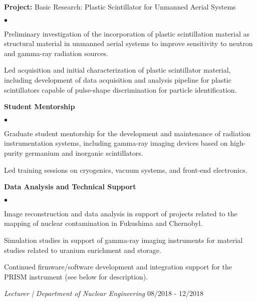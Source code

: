 \documentclass[margin,line]{res}
\newenvironment{list1}{
  \begin{list}{\ding{113}}{%
      \setlength{\itemsep}{0in}
      \setlength{\parsep}{0in} \setlength{\parskip}{0in}
      \setlength{\topsep}{0in} \setlength{\partopsep}{0in} 
      \setlength{\leftmargin}{0.17in}}}{\end{list}}
\newenvironment{list2}{
  \begin{list}{$\bullet$}{%
      \setlength{\itemsep}{0in}
      \setlength{\parsep}{0in} \setlength{\parskip}{0in}
      \setlength{\topsep}{0in} \setlength{\partopsep}{0in} 
      \setlength{\leftmargin}{0.2in}}}{\end{list}}
\begin{document}
\begin{resume}
\begin{list1}
  \item[] {\bf \small Project:} Basic Research: Plastic Scintillator for Unmanned Aerial Systems
  \begin{list2}
    \item Preliminary investigation of the incorporation of plastic 
          scintillation material as structural material in unmanned aerial
          systems to improve sensitivity to neutron and gamma-ray radiation
          sources.
    \item Led acquisition and initial characterization of plastic scintillator
          material, including development of data acquisition and analysis
          pipeline for plastic scintillators capable of pulse-shape
          discrimination for particle identification.
  \end{list2}
  \item[] {\bf \small Student Mentorship}
  \begin{list2}
    \item Graduate student mentorship for the development and maintenance of
          radiation instrumentation systems, including gamma-ray imaging
          devices based on high-purity germanium and inorganic scintillators.
    \item Led training sessions on cryogenics, vacuum systems, and front-end
          electronics.
  \end{list2}
  \item[] {\bf \small Data Analysis and Technical Support}
  \begin{list2}
    \item Image reconstruction and data analysis in support of projects 
          related to the mapping of nuclear contamination in Fukushima and
          Chernobyl.
    \item Simulation studies in support of gamma-ray imaging instruments for
          material studies related to uranium enrichment and storage.
    \item Continued firmware/software development and integration support for
          the PRISM instrument (see below for description).
  \end{list2}
\end{list1}

{\em Lecturer | Department of Nuclear Engineering} \hfill 08/2018 - 12/2018


\end{resume}
\end{document}
